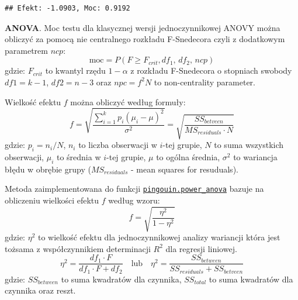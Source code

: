 \documentclass[polish,]{book}
\begin{document}
\begin{verbatim}
## Efekt: -1.0903, Moc: 0.9192
\end{verbatim}

\textbf{ANOVA}. Moc testu dla klasycznej wersji jednoczynnikowej ANOVY można obliczyć za pomocą nie centralnego rozkładu F-Snedecora czyli z dodatkowym parametrem \(ncp\):
\begin{equation}
\mbox{moc}=P(F\geq F_{crit},df_1,\, df_2,\, ncp)
\label{eq:moc04}
\end{equation}
gdzie: \(F_{crit}\) to kwantyl rzędu \(1-\alpha\) z rozkładu F-Snedecora o stopniach swobody \(df1=k-1\), \(df2=n-3\) oraz \(npc=f^2 N\) to non-centrality parameter.

Wielkość efektu \(f\) można obliczyć według formuły:
\begin{equation}
f=\sqrt{\frac{\sum_{i=1}^{k}p_i(\mu_i-\mu)^2}{\sigma^2}}=\sqrt{\frac{SS_{betveen}}{MS_{residuals}\cdot N}}
\label{eq:moc02}
\end{equation}
gdzie: \(p_i=n_i/N\), \(n_i\) to liczba obserwacji w \(i\)-tej grupie, \(N\) to suma wszystkich obserwacji, \(\mu_i\) to średnia w \(i\)-tej grupie, \(\mu\) to ogólna średnia, \(\sigma^2\) to wariancja błędu w obrębie grupy (\(MS_{residuals}\) - mean squares for resuduals).

Metoda zaimplementowana do funkcji \href{https://pingouin-stats.org/generated/pingouin.power_anova.html\#pingouin.power_anova}{\texttt{pingouin.power\_anova}} bazuje na obliczeniu wielkości efektu \(f\) według wzoru:
\begin{equation}
f=\sqrt{\frac{\eta^2}{1-\eta^2}}
\label{eq:moc05}
\end{equation}
gdzie: \(\eta^2\) to wielkość efektu dla jednoczynnikowej analizy wariancji która jest tożsama z współczynnikiem determinacji \(R^2\) dla regresji liniowej.
\begin{equation}
\eta^2=\frac{df_1\cdot F}{df_1\cdot F+df_2}\quad\mbox{lub} \quad \eta^2= \frac{SS_{between}}{SS_{residuals}+SS_{betveen}}
\label{eq:moc03}
\end{equation}
gdzie: \(SS_{between}\) to suma kwadratów dla czynnika, \(SS_{total}\) to suma kwadratów dla czynnika oraz reszt.
\end{document}
